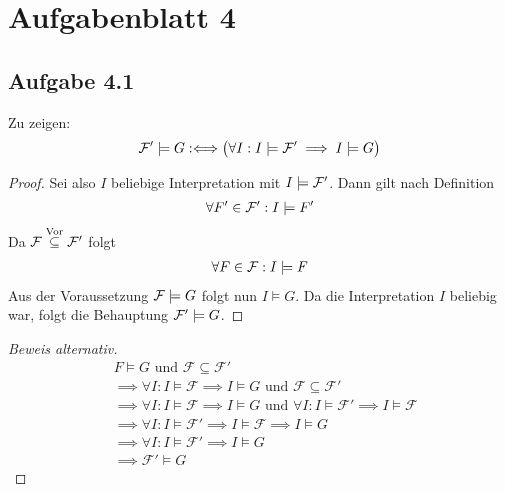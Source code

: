 
\section{Aufgabenblatt 4}
\subsection{Aufgabe 4.1}
Zu zeigen:
\begin{align*}
	\mathcal{F}'\models G:\Longleftrightarrow\big(\forall I:I\models\mathcal{F}'\implies I\models G\big)
\end{align*}

\begin{proof}
	Sei also $I$ beliebige Interpretation mit $I\models\mathcal{F}'$. 
	Dann gilt nach Definition
	\begin{align*}
		\forall F'\in\mathcal{F}':I\models F'
	\end{align*}
	Da $\mathcal{F}\stackrel{\text{Vor}}{\subseteq}\mathcal{F}'$ folgt 
	\begin{align*}
		\forall F\in\mathcal{F}:I\models F
	\end{align*}
	Aus der Voraussetzung $\mathcal{F}\models G$ folgt nun $I\models G$. 
	Da die Interpretation $I$ beliebig war, folgt die Behauptung $\mathcal{F}'\models G$. 
\end{proof}
\begin{proof}[Beweis alternativ]
	\begin{align*}
		& F \models G \text{ und } \mathcal{F} \subseteq \mathcal{F}'\\
		& \implies \forall I : I \models \mathcal{F} \implies I \models G \text{ und } \mathcal{F} \subseteq \mathcal{F}'\\
		& \implies \forall I : I \models \mathcal{F} \implies I \models G \text{ und } \forall I : I \models \mathcal{F}' \implies I \models \mathcal{F}\\
		& \implies \forall I : I \models \mathcal{F}' \implies I \models \mathcal{F} \implies I \models G\\
		& \implies \forall I : I \models \mathcal{F}' \implies I \models G\\
		& \implies \mathcal{F}' \models G
	\end{align*}
\end{proof}

